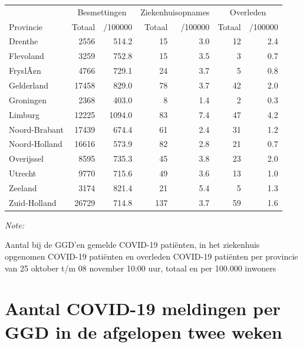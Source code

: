 \documentclass[
  english,
  man,floatsintext]{apa6}
\begin{document}
\begin{table}
\centering
\begin{threeparttable}
\begin{tabular}{lrrrrrr}
\toprule
\multicolumn{1}{c}{ } & \multicolumn{2}{c}{Besmettingen} & \multicolumn{2}{c}{Ziekenhuisopnames} & \multicolumn{2}{c}{Overleden} \\
\cmidrule(l{3pt}r{3pt}){2-3} \cmidrule(l{3pt}r{3pt}){4-5} \cmidrule(l{3pt}r{3pt}){6-7}
Provincie & Totaal & /100000 & Totaal & /100000 & Totaal & /100000\\
\midrule
Drenthe & 2556 & 514.2 & 15 & 3.0 & 12 & 2.4\\
Flevoland & 3259 & 752.8 & 15 & 3.5 & 3 & 0.7\\
FryslÃ¢n & 4766 & 729.1 & 24 & 3.7 & 5 & 0.8\\
Gelderland & 17458 & 829.0 & 78 & 3.7 & 42 & 2.0\\
Groningen & 2368 & 403.0 & 8 & 1.4 & 2 & 0.3\\
Limburg & 12225 & 1094.0 & 83 & 7.4 & 47 & 4.2\\
Noord-Brabant & 17439 & 674.4 & 61 & 2.4 & 31 & 1.2\\
Noord-Holland & 16616 & 573.9 & 82 & 2.8 & 21 & 0.7\\
Overijssel & 8595 & 735.3 & 45 & 3.8 & 23 & 2.0\\
Utrecht & 9770 & 715.6 & 49 & 3.6 & 13 & 1.0\\
Zeeland & 3174 & 821.4 & 21 & 5.4 & 5 & 1.3\\
Zuid-Holland & 26729 & 714.8 & 137 & 3.7 & 59 & 1.6\\
\bottomrule
\end{tabular}
\begin{tablenotes}
\item \textit{Note: } 
\item Aantal bij de GGD’en gemelde COVID-19 patiënten, in het ziekenhuis opgenomen COVID-19 patiënten en overleden COVID-19 patiënten per provincie van 25 oktober t/m 08 november 10:00 uur, totaal en per 100.000 inwoners
\end{tablenotes}
\end{threeparttable}
\end{table}

\newpage

\hypertarget{aantal-covid-19-meldingen-per-ggd-in-de-afgelopen-twee-weken}{%
\section{Aantal COVID-19 meldingen per GGD in de afgelopen twee weken}\label{aantal-covid-19-meldingen-per-ggd-in-de-afgelopen-twee-weken}}
\end{document}
